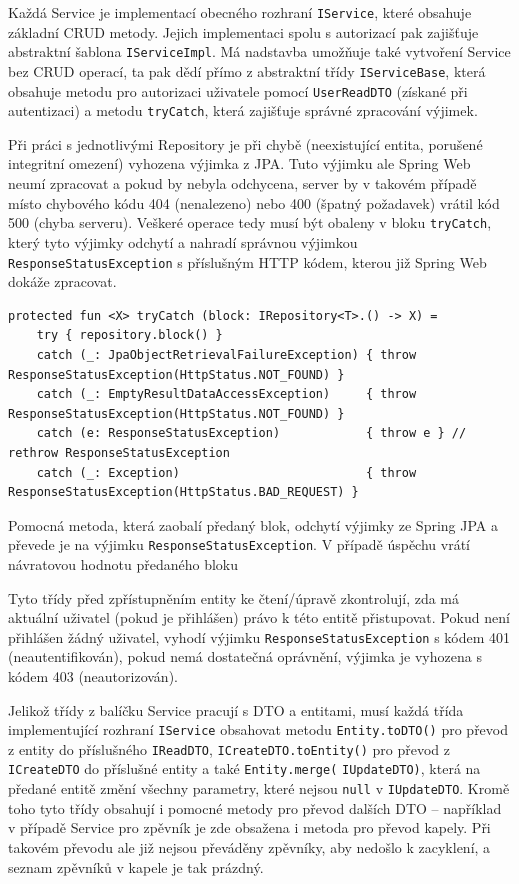 Každá Service je implementací obecného rozhraní \texttt{IService}, které obsahuje základní CRUD metody. Jejich implementaci spolu s autorizací pak zajišťuje abstraktní šablona \texttt{IServiceImpl}. Má nadstavba umožňuje také vytvoření Service bez CRUD operací, ta pak dědí přímo z abstraktní třídy \texttt{IServiceBase}, která obsahuje metodu pro autorizaci uživatele pomocí \texttt{UserReadDTO} (získané při autentizaci) a metodu \texttt{tryCatch}, která zajišťuje správné zpracování výjimek.

Při práci s jednotlivými Repository je při chybě (neexistující entita, porušené integritní omezení) vyhozena výjimka z JPA. Tuto výjimku ale Spring Web neumí zpracovat a pokud by nebyla odchycena, server by v takovém případě místo chybového kódu 404 (nenalezeno) nebo 400 (špatný požadavek) vrátil kód 500 (chyba serveru). Veškeré operace tedy musí být obaleny v bloku \texttt{tryCatch}, který tyto výjimky odchytí a nahradí správnou výjimkou \texttt{ResponseStatusException} s příslušným HTTP kódem, kterou již Spring Web dokáže zpracovat.

\begin{listing}[H]
\begin{verbatim}
protected fun <X> tryCatch (block: IRepository<T>.() -> X) = 
    try { repository.block() }
    catch (_: JpaObjectRetrievalFailureException) { throw ResponseStatusException(HttpStatus.NOT_FOUND) }
    catch (_: EmptyResultDataAccessException)     { throw ResponseStatusException(HttpStatus.NOT_FOUND) }
    catch (e: ResponseStatusException)            { throw e } // rethrow ResponseStatusException
    catch (_: Exception)                          { throw ResponseStatusException(HttpStatus.BAD_REQUEST) }
\end{verbatim}
\caption[Pomocná metoda pro zaobalení výjimek ze Spring JPA]{Pomocná metoda, která zaobalí předaný blok, odchytí výjimky ze Spring JPA a převede je na výjimku \texttt{ResponseStatusException}. V případě úspěchu vrátí návratovou hodnotu předaného bloku}
\end{listing}

Tyto třídy před zpřístupněním entity ke čtení/úpravě zkontrolují, zda má aktuální uživatel (pokud je přihlášen) právo k této entitě přistupovat. Pokud není přihlášen žádný uživatel, vyhodí výjimku \texttt{ResponseStatusException} s kódem 401 (neautentifikován), pokud nemá dostatečná oprávnění, výjimka je vyhozena s kódem 403 (neautorizován).

Jelikož třídy z balíčku Service pracují s DTO a entitami, musí každá třída implementující rozhraní \texttt{IService} obsahovat metodu \texttt{Entity.toDTO()} pro převod z entity do příslušného \texttt{IReadDTO}, \texttt{ICreateDTO.toEntity()} pro převod z \texttt{ICreateDTO} do příslušné entity
a také \texttt{Entity.merge(} \texttt{IUpdateDTO)}, která na předané entitě změní všechny parametry, které nejsou \texttt{null} v \texttt{IUpdateDTO}. Kromě toho tyto třídy obsahují i pomocné metody pro převod dalších DTO -- například v případě Service pro zpěvník je zde obsažena i metoda pro převod kapely. Při takovém převodu ale již nejsou převáděny zpěvníky, aby nedošlo k zacyklení, a seznam zpěvníků v kapele je tak prázdný.

